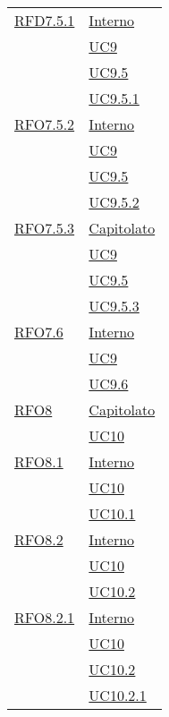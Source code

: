 \begin{longtable}{|>{\centering}m{5cm}|m{5cm}<{\centering}|}
   \hyperlink{RFD7.5.1}{RFD7.5.1} 
   & \hyperlink{Interno}{Interno}\\
   & \hyperref[UC9]{UC9}\\
   & \hyperref[UC9.5]{UC9.5}\\
   & \hyperref[UC9.5.1]{UC9.5.1}\\\hline
   
   \hyperlink{RFO7.5.2}{RFO7.5.2} 
   & \hyperlink{Interno}{Interno}\\
   & \hyperref[UC9]{UC9}\\
   & \hyperref[UC9.5]{UC9.5}\\
   & \hyperref[UC9.5.2]{UC9.5.2}\\\hline
   
   \hyperlink{RFO7.5.3}{RFO7.5.3} 
   & \hyperlink{Capitolato}{Capitolato}\\
   & \hyperref[UC9]{UC9}\\
   & \hyperref[UC9.5]{UC9.5}\\
   & \hyperref[UC9.5.3]{UC9.5.3}\\\hline
   
   \hyperlink{RFO7.6}{RFO7.6} 
   & \hyperlink{Interno}{Interno}\\
   & \hyperref[UC9]{UC9}\\
   & \hyperref[UC9.6]{UC9.6}\\\hline
   
   \hyperlink{RFO8}{RFO8} 
   & \hyperlink{Capitolato}{Capitolato}\\
   & \hyperref[UC10]{UC10}\\\hline
   
      \hyperlink{RFO8.1}{RFO8.1} 
      & \hyperlink{Interno}{Interno}\\
   & \hyperref[UC10]{UC10}\\
      & \hyperref[UC10.1]{UC10.1}\\\hline
  
      \hyperlink{RFO8.2}{RFO8.2} 
      & \hyperlink{Interno}{Interno}\\
  & \hyperref[UC10]{UC10}\\
  & \hyperref[UC10.2]{UC10.2}\\\hline
  
      \hyperlink{RFO8.2.1}{RFO8.2.1} 
      & \hyperlink{Interno}{Interno}\\
  & \hyperref[UC10]{UC10}\\
  & \hyperref[UC10.2]{UC10.2}\\
   & \hyperref[UC10.2.1]{UC10.2.1}\\\hline
   

\end{longtable}
